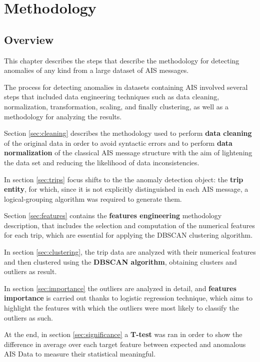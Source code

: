 \chapter{Methodology}
\label{ch:methodology}

\section{Overview}

This chapter describes the steps that describe the methodology for detecting anomalies of any kind from a large dataset of AIS messages.

The process for detecting anomalies in datasets containing AIS involved several steps that included data engineering techniques such as data cleaning, normalization, transformation, scaling, and finally clustering, as well as a methodology for analyzing the results.

Section \ref{sec:cleaning} describes the methodology used to perform \textbf{data cleaning} of the original data in order to avoid syntactic errors and to perform \textbf{data normalization} of the classical AIS message structure with the aim of lightening the data set and reducing the likelihood of data inconsistencies.

In section \ref{sec:trips} focus shifts to the the anomaly detection object: the \textbf{trip entity}, for which, since it is not explicitly distinguished in each AIS message, a logical-grouping algorithm was required to generate them.

Section \ref{sec:features} contains the \textbf{features engineering} methodology description, that includes the selection and computation of the numerical features for each trip, which are essential for applying the DBSCAN clustering algorithm.

In section \ref{sec:clustering}, the trip data are analyzed with their numerical features and then clustered using the \textbf{DBSCAN algorithm}, obtaining clusters and outliers as result.

In section \ref{sec:importance} the outliers are analyzed in detail, and \textbf{features importance} is carried out thanks to logistic regression technique, which aims to highlight the features with which the outliers were most likely to classify the outliers as such.

At the end, in section \ref{sec:significance} a \textbf{T-test} was ran in order to show the difference in average over each target feature between expected and anomalous AIS Data to measure their statistical meaningful.


